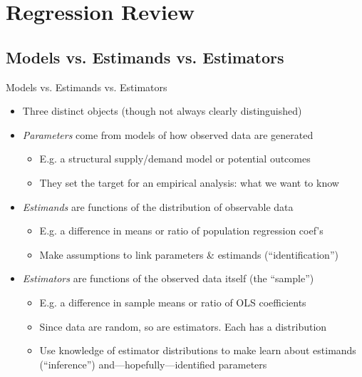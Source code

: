 \documentclass{beamer}
\begin{document}
\section{Regression Review}

\subsection{Models vs. Estimands vs. Estimators}
\begin{frame}{Models vs. Estimands vs. Estimators}
\begin{itemize}
\item Three distinct objects (though not always clearly distinguished) \pause{}\smallskip
\item \emph{Parameters} come from models of how observed data are generated\smallskip
\begin{itemize}
\item E.g. a structural supply/demand model or potential outcomes\smallskip
\item They set the target for an empirical analysis: what we want to know
\end{itemize}\pause{}\smallskip
\item \emph{Estimands} are functions of the distribution of observable data\smallskip
\begin{itemize}
\item E.g. a difference in means or ratio of population regression coef's\smallskip
\item Make assumptions to link parameters \& estimands (``identification'')
\end{itemize}\pause{}\smallskip
\item \emph{Estimators} are functions of the observed data itself (the ``sample'')\smallskip
\begin{itemize}
\item E.g. a difference in sample means or ratio of OLS coefficients\smallskip 
\item Since data are random, so are estimators. Each has a distribution\smallskip
\item Use knowledge of estimator distributions to make learn about estimands (``inference'') and---hopefully---identified parameters
\end{itemize}
\end{itemize}
\end{frame}
\end{document}
